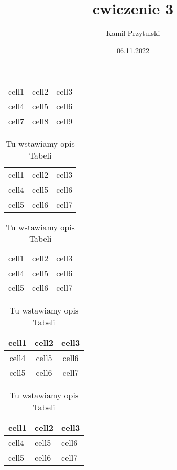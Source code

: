 \documentclass[12pt, letterpaper, titlepage]{article}
\title{cwiczenie 3 }
\author{Kamil Przytulski}
\date{06.11.2022}
\begin{document}
\maketitle

\begin{center}
\begin{tabular}{ c c c }
cell1 & cell2 & cell3 \\
cell4 & cell5 & cell6 \\
cell7 & cell8 & cell9
\end{tabular}
\end{center}


\begin{table}[h]
\centering\caption{Tu wstawiamy opis Tabeli}
\begin{tabular}{c c c}
cell1 & cell2 & cell3\\
cell4 & cell5 & cell6\\
cell5 & cell6 & cell7
\end{tabular}
\end{table}



\begin{table}[h]
\centering\caption{Tu wstawiamy opis Tabeli}
\begin{tabular}{c|c|c}
cell1 & cell2 & cell3\\
cell4 & cell5 & cell6\\
cell5 & cell6 & cell7
\end{tabular}
\end{table}


\begin{table}[h]
\centering\caption{Tu wstawiamy opis Tabeli}
\begin{tabular}{c c c}
cell1 & cell2 & cell3\\
\hline
cell4 & cell5 & cell6\\
\hline
cell5 & cell6 & cell7\\
\hline
\end{tabular}
\end{table}

\begin{table}[h]
\centering\caption{Tu wstawiamy opis Tabeli}
\begin{tabular}{|l|l|l|}
\hline
cell1 & cell2 & cell3\\
\hline
cell4 & cell5 & cell6\\
\hline
cell5 & cell6 & cell7\\
\hline
\end{tabular}
\end{table}
\end{document}
